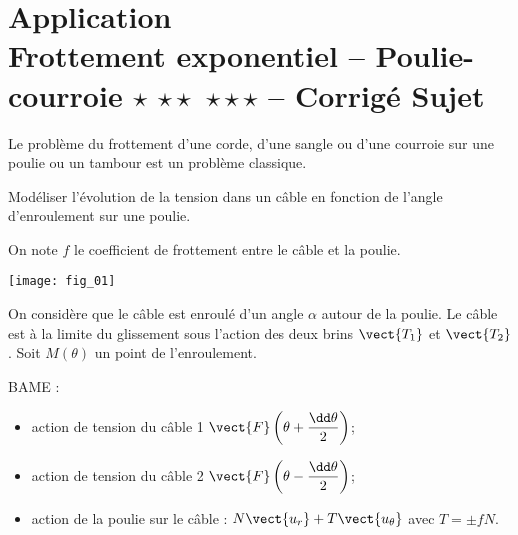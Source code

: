 \chapter*{Application  \\ 
Frottement exponentiel -- Poulie-courroie  \ifnormal $\star$ \else \fi \ifdifficile $\star\star$ \else \fi \iftdifficile $\star\star\star$ \else \fi -- \ifprof Corrigé \else Sujet \fi}

\iflivret {} \else
\ifprof  {} \else \fi
\fi

\setcounter{question}{0}

Le problème du frottement d'une corde, d'une sangle ou d'une courroie sur une poulie ou
un tambour est un problème classique. 
\begin{obj}
Modéliser l'évolution de la tension dans un câble en fonction de l'angle d'enroulement sur une poulie. 
\end{obj}

On note $f$ le coefficient de frottement entre le câble et la poulie. 
\begin{center}
\texttt{[image: fig\_01]}
\end{center}

On considère que le câble est enroulé d'un angle $\alpha$ autour de la poulie. Le câble est à la limite du glissement sous l'action des deux brins $\vect{T_1}$ et $\vect{T_2}$. Soit $M(\theta)$ un point de l'enroulement. 

\ifprof
\begin{corrige}
BAME :
\begin{itemize}
\item action de tension du câble 1 $\vect{F}\left(\theta+\dfrac{\dd \theta}{2}\right)$;
\item action de tension du câble 2 $\vect{F}\left(\theta-\dfrac{\dd \theta}{2}\right)$;
\item action de la poulie sur le câble : $N\vect{u_r}+T\vect{u_{\theta}}$ avec $T=\pm fN$.
\end{itemize}

\end{corrige}
\else
\fi


